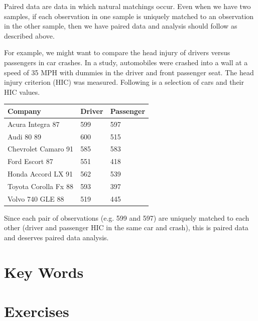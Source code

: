 \documentclass[11pt, chapterprefix=true]{scrbook}\usepackage[]{graphicx}\usepackage[]{color}
\begin{document}
Paired data are data in which natural matchings occur.  Even when we have two samples, if each observation in one sample is uniquely matched to an observation in the other sample, then we have paired data and analysis should follow as described above.  

For example, we might want to compare the head injury of drivers versus passengers in car crashes.   In a study, automobiles were crashed into a wall at a speed of 35 MPH with dummies in the driver and front passenger seat. The head injury criterion (HIC) was measured.  Following is a selection of cars and their HIC values.

\begin{table}[ht]
\centering
\begin{tabular}{@{} lll @{}} \hline
Company & Driver & Passenger \\ \hline
Acura Integra 87        &     		599   &      597 \\
Audi 80 89              &    		600    &     515 \\
Chevrolet Camaro 91     &    		585    &     583 \\
Ford Escort 87          &     		551   &      418 \\
Honda Accord LX 91      &     	562     &    539 \\
Toyota Corolla Fx 88    &    		593     &    397 \\
Volvo 740 GLE 88        &      		519   &      445 \\ \hline
\end{tabular}
\end{table}

Since each pair of observations (e.g. 599 and 597) are uniquely matched to each other (driver and passenger HIC in the same car and crash), this is paired data and deserves paired data analysis.

\section{Key Words}


\twocolumn

\section{Exercises}
\end{document}
